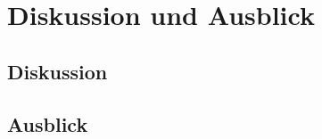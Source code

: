 


\chapter{Diskussion und Ausblick} %

\label{Chapter5} %


\section{Diskussion}



\section{Ausblick}



